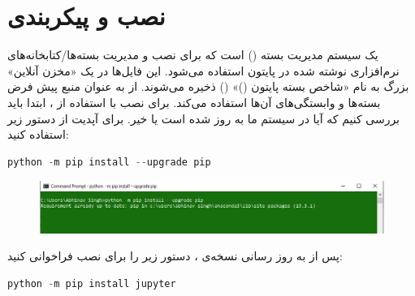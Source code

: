 \documentclass{article}
\begin{document}
\section{نصب و پیکربندی }
 یک سیستم مدیریت بسته () است که برای نصب و مدیریت بسته‌ها/کتابخانه‌های نرم‌افزاری نوشته شده در پایتون استفاده می‌شود. این فایل‌ها در یک «مخزن آنلاین» بزرگ به نام «شاخص بسته پایتون ()» () ذخیره می‌شوند.
 از  به عنوان منبع پیش فرض بسته‌ها و وابستگی‌های آن‌ها استفاده می‌کند. برای نصب  با استفاده از ، ابتدا باید بررسی کنیم که آیا  در سیستم ما به روز شده است یا خیر. برای آپدیت  از دستور زیر استفاده کنید:
\begin{latin}
\begin{lstlisting}[language=Python]
python -m pip install --upgrade pip
\end{lstlisting}
\end{latin}
\begin{figure}[H]
    \centering
    \includegraphics[width=1.0\textwidth]{figures/7.jpg}
    \caption
	{}
    \label{fig:fig1}
\end{figure}
پس از به روز رسانی نسخه‌ی ، دستور زیر را برای نصب  فراخوانی کنید:
\begin{latin}
\begin{lstlisting}[language=Python]
python -m pip install jupyter
\end{lstlisting}
\end{latin}
\end{document}
